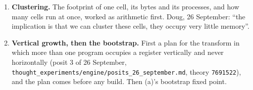 \begin{enumerate}
\begin{itemize}
\begin{enumerate}
\begin{itemize}
\begin{itemize}
\item \textbf{The lane in clock states} (in progress, uncommitted). State forms cut the lane into clock states, and \texttt{vhdl.\allowbreak{}krs} writes a clocked entity, \texttt{cycle\_\allowbreak{}lane\_\allowbreak{}unit}. \textbf{Measured, 27 September, on the Pi, off main:} 12 passed and 0 failed, and every program equals the host both cut only where it must be (4 states) and with every form alone (141 to 289 states). \texttt{ghdl -{}-synth} accepts it. For form limit with every form alone over 256 words, Yosys gives 167,697 generic cells and a longest path of 38 cells, and infers no RAM yet: the memory became flip-flops.
\end{itemize}
\end{itemize}
\item \textbf{Clustering.} The footprint of one cell, its bytes and its processes, and how many cells run at once, worked as arithmetic first. Doug, 26 September: “the implication is that we can cluster these cells, they occupy very little memory”.
\item \textbf{Vertical growth, then the bootstrap.} First a plan for the transform in which more than one program occupies a register vertically and never horizontally (posit 3 of 26 September, \texttt{thought\_\allowbreak{}experiments/\allowbreak{}engine/\allowbreak{}posits\_\allowbreak{}26\_\allowbreak{}september.\allowbreak{}md}, theory \texttt{7691522}), and the plan comes before any build. Then (a)'s bootstrap fixed point.


\end{enumerate}
\end{itemize}
\end{enumerate}
